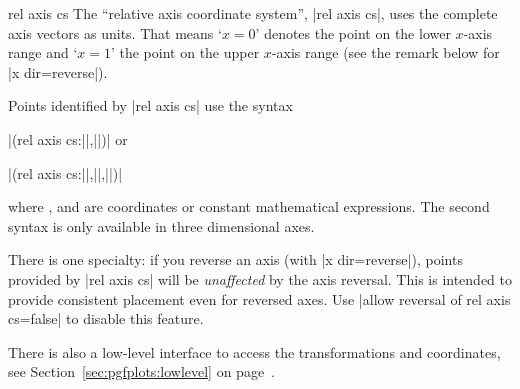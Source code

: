 \begin{coordinatesystem}{rel axis cs}
    The ``relative axis coordinate system'', |rel axis cs|, uses the complete
    axis vectors as units. That means `$x=0$' denotes the point on the lower
    $x$-axis range and `$x=1$' the point on the upper $x$-axis range (see the
    remark below for |x dir=reverse|).
\pgfplotsexpensiveexample
\begin{codeexample}[]
\end{codeexample}

\pgfplotsexpensiveexample
\begin{codeexample}[]
\end{codeexample}

    Points identified by |rel axis cs| use the syntax

        |(rel axis cs:||,||)| or

        |(rel axis cs:||,||,||)|

    \noindent where ,  and  are coordinates or constant
    mathematical expressions. The second syntax is only available in three
    dimensional axes.

    There is one specialty: if you reverse an axis (with |x dir=reverse|),
    points provided by |rel axis cs| will be \emph{unaffected} by the axis
    reversal. This is intended to provide consistent placement even for
    reversed axes. Use |allow reversal of rel axis cs=false| to disable this
    feature.

    There is also a low-level interface to access the transformations and
    coordinates, see Section~\ref{sec:pgfplots:lowlevel} on
    page~\pageref{sec:pgfplots:lowlevel}.
\end{coordinatesystem}

